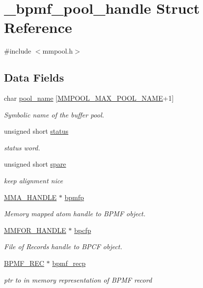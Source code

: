 \hypertarget{struct__bpmf__pool__handle}{\section{\-\_\-bpmf\-\_\-pool\-\_\-handle Struct Reference}
\label{struct__bpmf__pool__handle}
}


{\ttfamily \#include $<$mmpool.\-h$>$}

\subsection*{Data Fields}
\begin{DoxyCompactItemize}
\item 
char \hyperlink{struct__bpmf__pool__handle_a74e3da7948675b5c73197ddde06dfe35}{pool\-\_\-name} \mbox{[}\hyperlink{mmpool_8h_ab1c7dc5e75ad9fc419f257e4cab04365}{M\-M\-P\-O\-O\-L\-\_\-\-M\-A\-X\-\_\-\-P\-O\-O\-L\-\_\-\-N\-A\-M\-E}+1\mbox{]}
\begin{DoxyCompactList}\small\item\em Symbolic name of the buffer pool. \end{DoxyCompactList}\item 
unsigned short \hyperlink{struct__bpmf__pool__handle_a724f8cf1b8ff3d96c3a9cbcd2a6957a6}{status}
\begin{DoxyCompactList}\small\item\em status word. \end{DoxyCompactList}\item 
unsigned short \hyperlink{struct__bpmf__pool__handle_a98efda18e7b0a66854cd9b0963832b1a}{spare}
\begin{DoxyCompactList}\small\item\em keep alignment nice \end{DoxyCompactList}\item 
\hyperlink{struct_m_m_a___h_a_n_d_l_e}{M\-M\-A\-\_\-\-H\-A\-N\-D\-L\-E} $\ast$ \hyperlink{struct__bpmf__pool__handle_a1f93789665c7c7fe6e6e64f71e3ad84b}{bpmfp}
\begin{DoxyCompactList}\small\item\em Memory mapped atom handle to B\-P\-M\-F object. \end{DoxyCompactList}\item 
\hyperlink{mmfor_8h_a6afc6b250952ab4716a5655a6705d2bc}{M\-M\-F\-O\-R\-\_\-\-H\-A\-N\-D\-L\-E} $\ast$ \hyperlink{struct__bpmf__pool__handle_ae7f6059d760dda3160d4510368eaa081}{bpcfp}
\begin{DoxyCompactList}\small\item\em File of Records handle to B\-P\-C\-F object. \end{DoxyCompactList}\item 
\hyperlink{mmpool_8h_aa0c91ddada50acf42b4c4ca0a49d6af5}{B\-P\-M\-F\-\_\-\-R\-E\-C} $\ast$ \hyperlink{struct__bpmf__pool__handle_ad41847bd431cf72560236fd7a992c34d}{bpmf\-\_\-recp}
\begin{DoxyCompactList}\small\item\em ptr to in memory representation of B\-P\-M\-F record \end{DoxyCompactList}\end{DoxyCompactItemize}



